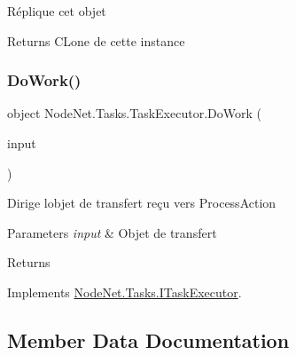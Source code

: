 Réplique cet objet 

\begin{DoxyReturn}{Returns}
C\+Lone de cette instance
\end{DoxyReturn}
\mbox{\label{class_node_net_1_1_tasks_1_1_task_executor_ad42635f3fd256939000c4f77705d2d42}} 
\subsubsection{\texorpdfstring{Do\+Work()}{DoWork()}}
{\footnotesize\ttfamily object Node\+Net.\+Tasks.\+Task\+Executor.\+Do\+Work (\begin{DoxyParamCaption}\item[{\hyperlink{class_node_net_1_1_data_1_1_data_input}{Data\+Input}}]{input }\end{DoxyParamCaption})}



Dirige l\textquotesingle{}objet de transfert reçu vers Process\+Action 


\begin{DoxyParams}{Parameters}
{\em input} & Objet de transfert\\
\hline
\end{DoxyParams}
\begin{DoxyReturn}{Returns}

\end{DoxyReturn}


Implements \hyperlink{interface_node_net_1_1_tasks_1_1_i_task_executor_aa4abf3c0f5e8d8088be22e7977291f93}{Node\+Net.\+Tasks.\+I\+Task\+Executor}.



\subsection{Member Data Documentation}
\mbox{\label{class_node_net_1_1_tasks_1_1_task_executor_a269ae65a85a59965fe02aef617c6ce44}} 
